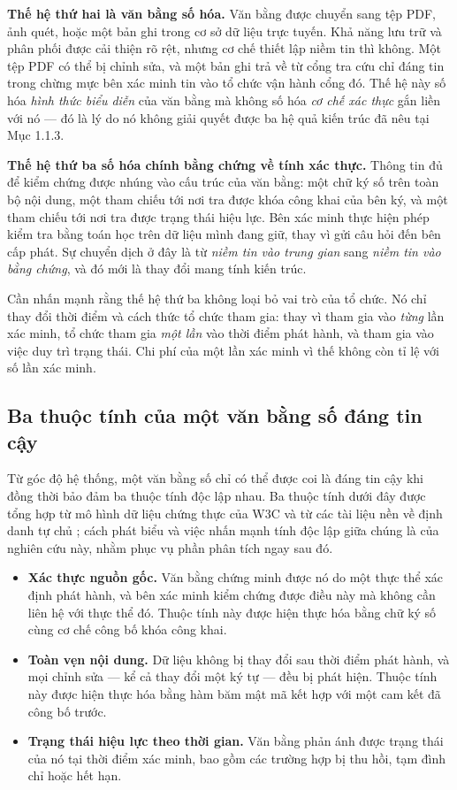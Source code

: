 \textbf{Thế hệ thứ hai là văn bằng số hóa.} Văn bằng được chuyển sang tệp PDF, ảnh quét, hoặc một bản ghi trong cơ sở dữ liệu trực tuyến. Khả năng lưu trữ và phân phối được cải thiện rõ rệt, nhưng cơ chế thiết lập niềm tin thì không. Một tệp PDF có thể bị chỉnh sửa, và một bản ghi trả về từ cổng tra cứu chỉ đáng tin trong chừng mực bên xác minh tin vào tổ chức vận hành cổng đó. Thế hệ này số hóa \emph{hình thức biểu diễn} của văn bằng mà không số hóa \emph{cơ chế xác thực} gắn liền với nó --- đó là lý do nó không giải quyết được ba hệ quả kiến trúc đã nêu tại Mục 1.1.3.

\textbf{Thế hệ thứ ba số hóa chính bằng chứng về tính xác thực.} Thông tin đủ để kiểm chứng được nhúng vào cấu trúc của văn bằng: một chữ ký số trên toàn bộ nội dung, một tham chiếu tới nơi tra được khóa công khai của bên ký, và một tham chiếu tới nơi tra được trạng thái hiệu lực. Bên xác minh thực hiện phép kiểm tra bằng toán học trên dữ liệu mình đang giữ, thay vì gửi câu hỏi đến bên cấp phát. Sự chuyển dịch ở đây là từ \emph{niềm tin vào trung gian} sang \emph{niềm tin vào bằng chứng}, và đó mới là thay đổi mang tính kiến trúc.

Cần nhấn mạnh rằng thế hệ thứ ba không loại bỏ vai trò của tổ chức. Nó chỉ thay đổi thời điểm và cách thức tổ chức tham gia: thay vì tham gia vào \emph{từng} lần xác minh, tổ chức tham gia \emph{một lần} vào thời điểm phát hành, và tham gia vào việc duy trì trạng thái. Chi phí của một lần xác minh vì thế không còn tỉ lệ với số lần xác minh.

\subsection{Ba thuộc tính của một văn bằng số đáng tin cậy}

Từ góc độ hệ thống, một văn bằng số chỉ có thể được coi là đáng tin cậy khi đồng thời bảo đảm ba thuộc tính độc lập nhau. Ba thuộc tính dưới đây được tổng hợp từ mô hình dữ liệu chứng thực của W3C \cite{W3C_VCDM2025} và từ các tài liệu nền về định danh tự chủ \cite{Preukschat2021, Sedlmeir2021}; cách phát biểu và việc nhấn mạnh tính độc lập giữa chúng là của nghiên cứu này, nhằm phục vụ phần phân tích ngay sau đó.

\begin{itemize}
    \item \textbf{Xác thực nguồn gốc.} Văn bằng chứng minh được nó do một thực thể xác định phát hành, và bên xác minh kiểm chứng được điều này mà không cần liên hệ với thực thể đó. Thuộc tính này được hiện thực hóa bằng chữ ký số cùng cơ chế công bố khóa công khai.
    \item \textbf{Toàn vẹn nội dung.} Dữ liệu không bị thay đổi sau thời điểm phát hành, và mọi chỉnh sửa --- kể cả thay đổi một ký tự --- đều bị phát hiện. Thuộc tính này được hiện thực hóa bằng hàm băm mật mã kết hợp với một cam kết đã công bố trước.
    \item \textbf{Trạng thái hiệu lực theo thời gian.} Văn bằng phản ánh được trạng thái của nó tại thời điểm xác minh, bao gồm các trường hợp bị thu hồi, tạm đình chỉ hoặc hết hạn.
\end{itemize}


